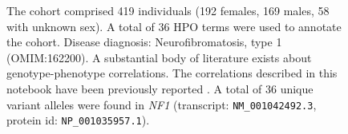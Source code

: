 \begin{figure}[htbp]
\caption{ The cohort comprised 419 individuals (192 females, 169 males, 58 with unknown sex). A total of 36 HPO terms were used to annotate the cohort. Disease diagnosis: Neurofibromatosis, type 1 (OMIM:162200). A substantial body of literature exists about genotype-phenotype correlations. The correlations described in this notebook
have been previously reported \cite{PMID_26178382,PMID_17160901,PMID_20513137}.
 A total of 36 unique variant alleles were found in \textit{NF1} (transcript: \texttt{NM\_001042492.3}, protein id: \texttt{NP\_001035957.1}).}
\end{figure}
